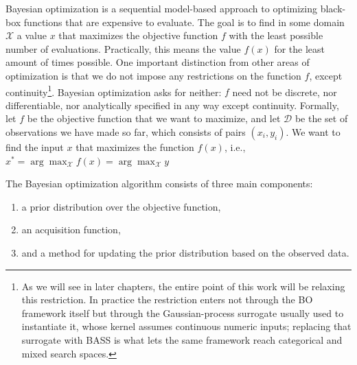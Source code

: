 Bayesian optimization is a sequential model-based approach to optimizing black-box functions that are expensive to evaluate. The goal is to find in some domain $\mathcal{X}$ a value $x$ that maximizes the objective function $f$ with the least possible number of evaluations. Practically, this means  the value $f(x)$ for the least amount of times possible. One important distinction from other areas of optimization is that we do not impose any restrictions on the function $f$, except continuity\footnote{As we will see in later chapters, the entire point of this work will be relaxing this restriction. In practice the restriction enters not through the BO framework itself but through the Gaussian-process surrogate usually used to instantiate it, whose kernel assumes continuous numeric inputs; replacing that surrogate with BASS is what lets the same framework reach categorical and mixed search spaces.}.  Bayesian optimization asks for neither: $f$ need not be discrete, nor differentiable, nor analytically specified in any way except continuity. Formally, let $f$ be the objective function that we want to maximize, and let $\mathcal{D}$ be the set of observations we have made so far, which consists of pairs $(x_i, y_i)$. We want to find the input $x$ that maximizes the function $f(x)$, i.e., $x^* = \arg\max_\mathcal{X} f(x) = \arg\max_\mathcal{X} y$

The Bayesian optimization algorithm consists of three main components: 

\begin{enumerate}
	\item a prior distribution over the objective function,
	\item an acquisition function,
	\item and a method for updating the prior distribution based on the observed data.
\end{enumerate}


